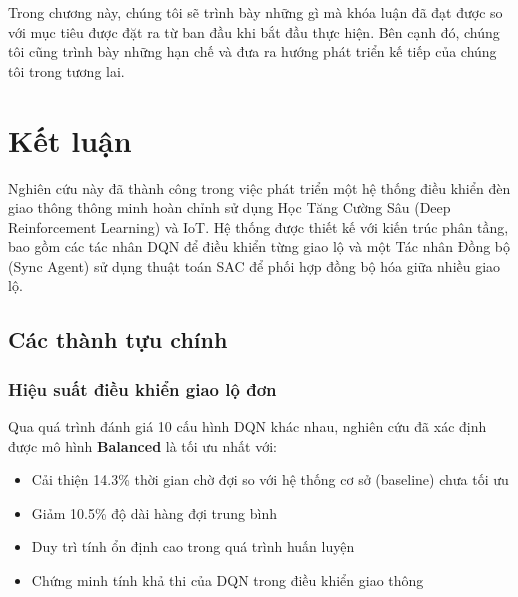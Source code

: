 Trong chương này, chúng tôi sẽ trình bày những gì mà khóa luận đã đạt được so
với mục tiêu được đặt ra từ ban đầu khi bắt đầu thực hiện. Bên cạnh đó, chúng
tôi cũng trình bày những hạn chế và đưa ra hướng phát triển kế tiếp của chúng
tôi trong tương lai.

\section{Kết luận}

Nghiên cứu này đã thành công trong việc phát triển một hệ thống điều khiển đèn
giao thông thông minh hoàn chỉnh sử dụng Học Tăng Cường Sâu (Deep Reinforcement Learning) và IoT. Hệ thống
được thiết kế với kiến trúc phân tầng, bao gồm các tác nhân DQN để điều khiển
từng giao lộ và một Tác nhân Đồng bộ (Sync Agent) sử dụng thuật toán SAC để phối hợp đồng bộ hóa
giữa nhiều giao lộ.

\subsection{Các thành tựu chính}

\subsubsection{Hiệu suất điều khiển giao lộ đơn}
Qua quá trình đánh giá 10 cấu hình DQN khác nhau, nghiên cứu đã xác định được mô
hình \textbf{Balanced} là tối ưu nhất với:
\begin{itemize}
    \item Cải thiện 14.3\% thời gian chờ đợi so với hệ thống cơ sở (baseline) chưa tối ưu

    \item Giảm 10.5\% độ dài hàng đợi trung bình

    \item Duy trì tính ổn định cao trong quá trình huấn luyện

    \item Chứng minh tính khả thi của DQN trong điều khiển giao thông
\end{itemize}

